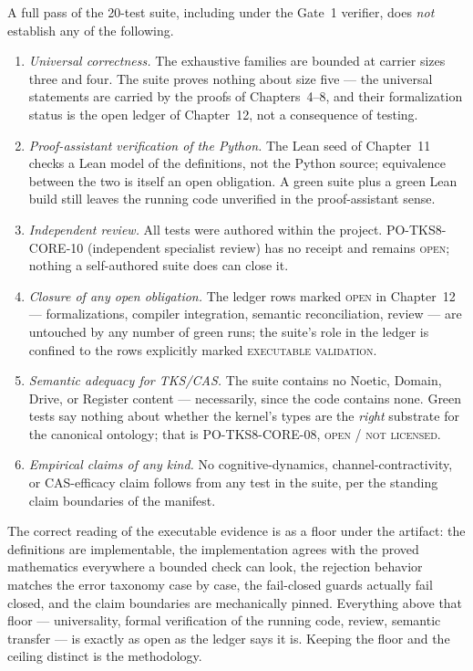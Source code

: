 \begin{boundary}\label{ch10:bdy:negative}
A full pass of the 20-test suite, including under the Gate~1 verifier,
does \emph{not} establish any of the following.
\begin{enumerate}
\item \emph{Universal correctness.} The exhaustive families are bounded at
      carrier sizes three and four. The suite proves nothing about size
      five --- the universal statements are carried by the proofs of
      Chapters~4--8, and their formalization status is the open ledger of
      Chapter~12, not a consequence of testing.
\item \emph{Proof-assistant verification of the Python.} The Lean seed of
      Chapter~11 checks a Lean model of the definitions, not the Python
      source; equivalence between the two is itself an open obligation.
      A green suite plus a green Lean build still leaves the running code
      unverified in the proof-assistant sense.
\item \emph{Independent review.} All tests were authored within the
      project. PO-TKS8-CORE-10 (independent specialist review) has no
      receipt and remains \textsc{open}; nothing a self-authored suite
      does can close it.
\item \emph{Closure of any open obligation.} The ledger rows marked
      \textsc{open} in Chapter~12 --- formalizations, compiler
      integration, semantic reconciliation, review --- are untouched by
      any number of green runs; the suite's role in the ledger is
      confined to the rows explicitly marked \textsc{executable
      validation}.
\item \emph{Semantic adequacy for TKS/CAS.} The suite contains no Noetic,
      Domain, Drive, or Register content --- necessarily, since the code
      contains none. Green tests say nothing about whether the kernel's
      types are the \emph{right} substrate for the canonical ontology;
      that is PO-TKS8-CORE-08, \textsc{open / not licensed}.
\item \emph{Empirical claims of any kind.} No cognitive-dynamics,
      channel-contractivity, or CAS-efficacy claim follows from any test
      in the suite, per the standing claim boundaries of the manifest.
\end{enumerate}
\end{boundary}

\begin{remark}\label{ch10:rem:floor}
The correct reading of the executable evidence is as a floor under the
artifact: the definitions are implementable, the implementation agrees
with the proved mathematics everywhere a bounded check can look, the
rejection behavior matches the error taxonomy case by case, the
fail-closed guards actually fail closed, and the claim boundaries are
mechanically pinned. Everything above that floor --- universality,
formal verification of the running code, review, semantic transfer ---
is exactly as open as the ledger says it is. Keeping the floor and the
ceiling distinct is the methodology.
\end{remark}
